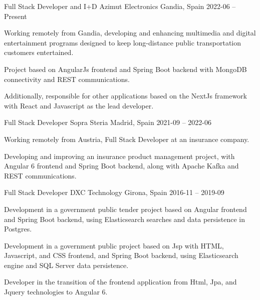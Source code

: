 \documentclass[]{awesome-cv}
\begin{document}
\begin{cventries}
	\cventry
	{Full Stack Developer and I+D}
	{Azimut Electronics}
	{Gandia, Spain}
	{2022-06 – Present}
	{\begin{cvitems}
		\vspace{0.5mm}
		\item {Working remotely from Gandia, developing and enhancing multimedia and digital entertainment programs designed to keep long-distance public transportation customers entertained.}
		\item {Project based on AngularJs frontend and Spring Boot backend with MongoDB connectivity and REST communications.}
        \item {Additionally, responsible for other applications based on the NextJs framework with React and Javascript as the lead developer.}
		\end{cvitems}}

	\cventry
	{Full Stack Developer}
	{Sopra Steria}
	{Madrid, Spain}
	{2021-09 – 2022-06}
	{\begin{cvitems}
		\vspace{0.5mm}
		\item {Working remotely from Austria, Full Stack Developer at an insurance company.}
		\item {Developing and improving an insurance product management project, with Angular 6 frontend and Spring Boot backend, along with Apache Kafka and REST communications.}
		\end{cvitems}}

	\cventry
	{Full Stack Developer}
	{DXC Technology}
	{Girona, Spain}
	{2016-11 – 2019-09}
	{\begin{cvitems}
		\vspace{0.5mm}
		\item {Development in a government public tender project based on Angular frontend and Spring Boot backend, using Elasticsearch searches and data persistence in Postgres.}
  \item {Development in a government public project based on Jsp with HTML, Javascript, and CSS frontend, and Spring Boot backend, using Elasticsearch engine and SQL Server data persistence.}
  \item {Developer in the transition of the frontend application from Html, Jpa, and Jquery technologies to Angular 6.}
		\end{cvitems}}


\end{cventries}
\end{document}
